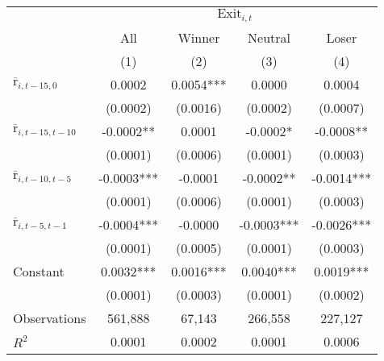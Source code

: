 \begin{tabular}{lcccc}
\toprule
 & \multicolumn{4}{c}{$\text{Exit}_{i,t}$} \\
\cmidrule{2-5}
 & All & Winner & Neutral & Loser\\
 & (1) & (2) & (3) & (4) \\
\midrule
$\overline{\text{r}}_{i,t-15,0}$ & 0.0002 & 0.0054*** & 0.0000 & 0.0004 \\
 & (0.0002) & (0.0016) & (0.0002) & (0.0007) \\
$\overline{\text{r}}_{i,t-15,t-10}$ & -0.0002** & 0.0001 & -0.0002* & -0.0008** \\
 & (0.0001) & (0.0006) & (0.0001) & (0.0003) \\
$\overline{\text{r}}_{i,t-10,t-5}$ & -0.0003*** & -0.0001 & -0.0002** & -0.0014*** \\
 & (0.0001) & (0.0006) & (0.0001) & (0.0003) \\
$\overline{\text{r}}_{i,t-5,t-1}$ & -0.0004*** & -0.0000 & -0.0003*** & -0.0026*** \\
 & (0.0001) & (0.0005) & (0.0001) & (0.0003) \\
Constant & 0.0032*** & 0.0016*** & 0.0040*** & 0.0019*** \\
 & (0.0001) & (0.0003) & (0.0001) & (0.0002) \\
\midrule
Observations & 561,888 & 67,143 & 266,558 & 227,127 \\
$R^2$ & 0.0001 & 0.0002 & 0.0001 & 0.0006 \\
\bottomrule
\end{tabular}